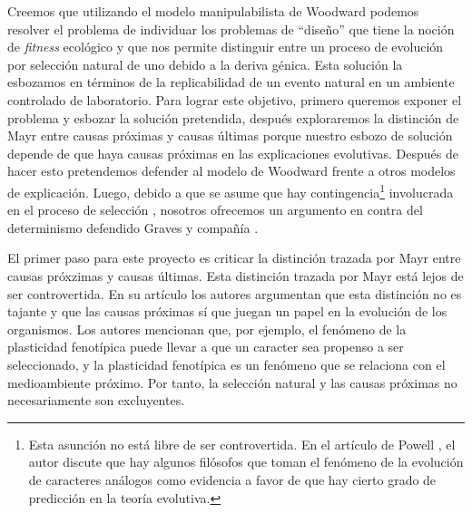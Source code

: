 Creemos que utilizando el modelo manipulabilista de Woodward podemos resolver el problema de individuar los problemas de ``diseño''  que tiene la noción de \emph{fitness} ecológico \cite{Bouchard2004, sep-fitness} y que nos permite distinguir entre un proceso de evolución por selección natural de uno debido a la deriva génica. Esta solución la esbozamos en términos de la replicabilidad de un evento natural en un ambiente controlado de laboratorio. Para lograr este objetivo, primero queremos exponer el problema y esbozar la solución pretendida, después exploraremos la distinción de Mayr entre causas próximas y causas últimas porque nuestro esbozo de solución depende de que haya causas próximas en las explicaciones evolutivas. Después de hacer esto pretendemos defender al modelo de Woodward frente a otros modelos de explicación. Luego, debido a que se asume que hay contingencia\footnote{Esta asunción no está libre de ser controvertida. En el artículo de Powell \citeyear{Powell2012}, el autor discute que hay algunos filósofos que toman el fenómeno de la evolución de caracteres análogos como evidencia a favor de que hay cierto grado de predicción en la teoría evolutiva.} involucrada en el proceso de selección \cite{Scriven1959, Mayr1998}, nosotros ofrecemos un argumento en contra del determinismo defendido Graves y compañía \cite{Graves1999}.


El primer paso para este proyecto es criticar la distinción trazada por Mayr entre causas próxzimas y causas últimas. Esta distinción trazada por Mayr está lejos de ser controvertida. En su artículo \cite{Laland2011} los autores argumentan que esta distinción no es tajante y que las causas próximas sí que juegan un papel en la evolución de los organismos. Los autores mencionan que, por ejemplo, el fenómeno de la plasticidad fenotípica puede llevar a que un caracter sea propenso a ser seleccionado, y la plasticidad fenotípica es un fenómeno que se relaciona con el medioambiente próximo. Por tanto, la selección natural y las causas próximas no necesariamente son excluyentes.

